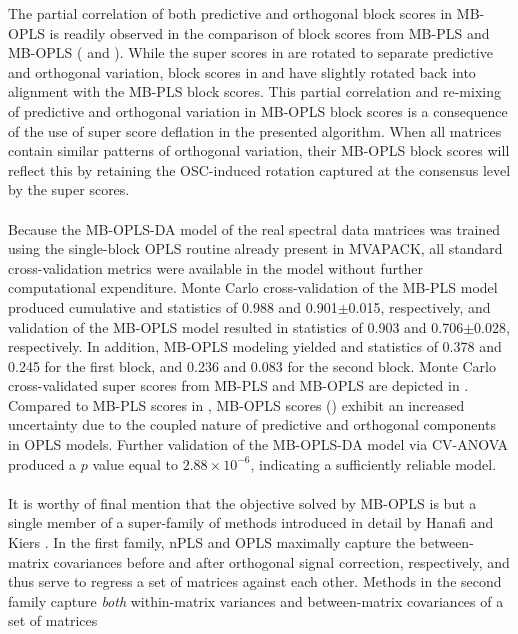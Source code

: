 \begin{doublespace}
The partial correlation of both predictive and orthogonal block scores in
MB-OPLS is readily observed in the comparison of block scores from MB-PLS
and MB-OPLS ( and ). While the
super scores in  are rotated to separate predictive
and orthogonal variation, block scores in  and
 have slightly rotated back into alignment with
the MB-PLS block scores. This partial correlation and re-mixing of
predictive and orthogonal variation in MB-OPLS block scores is a consequence
of the use of super score deflation in the presented algorithm. When all
matrices contain similar patterns of orthogonal variation, their MB-OPLS
block scores will reflect this by retaining the OSC-induced rotation captured
at the consensus level by the super scores.
\\\\
Because the MB-OPLS-DA model of the real spectral data matrices was trained
using the single-block OPLS routine already present in MVAPACK, all standard
cross-validation metrics were available in the model without further
computational expenditure. Monte Carlo cross-validation of the MB-PLS model
produced cumulative \rsqy{} and \qsq{} statistics of 0.988 and
0.901$\pm$0.015, respectively, and validation of the MB-OPLS model resulted
in statistics of 0.903 and 0.706$\pm$0.028, respectively. In addition, MB-OPLS
modeling yielded \rsqxp{} and \rsqxo{} statistics of 0.378 and 0.245 for the
first block, and 0.236 and 0.083 for the second block. Monte Carlo
cross-validated super scores from MB-PLS and MB-OPLS are depicted in
. Compared to MB-PLS scores in
, MB-OPLS scores
() exhibit an increased uncertainty due to the
coupled nature of predictive and orthogonal components in OPLS models.
Further validation of the MB-OPLS-DA model via CV-ANOVA produced
a $p$ value equal to $2.88 \times 10^{-6}$, indicating a sufficiently
reliable model.
\\\\
It is worthy of final mention that the objective solved by MB-OPLS is but a
single member of a super-family of methods introduced in detail by Hanafi
and Kiers \cite{hanafi:csda2006}. In the first family, nPLS and OPLS maximally
capture the between-matrix covariances before and after orthogonal signal
correction, respectively, and thus serve to regress a set of matrices
against each other. Methods in the second family capture \emph{both}
within-matrix variances and between-matrix covariances of a set of matrices

\end{doublespace}
